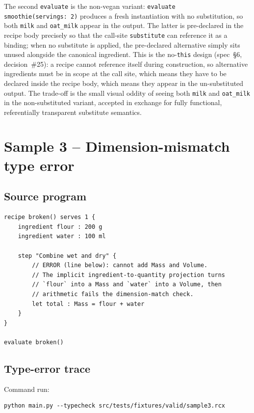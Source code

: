 \documentclass[11pt,a4paper]{article}
\begin{document}
The second \texttt{evaluate} is the non-vegan variant: \texttt{evaluate
smoothie(servings:~2)} produces a fresh instantiation with no
substitution, so both \texttt{milk} and \texttt{oat\_milk} appear in
the output. The latter is pre-declared in the recipe body precisely so
that the call-site \texttt{substitute} can reference it as a binding;
when no substitute is applied, the pre-declared alternative simply
sits unused alongside the canonical ingredient. This is the
no-\texttt{this} design (spec~\S6, decision~\#25): a recipe cannot
reference itself during construction, so alternative ingredients must
be in scope at the call site, which means they have to be declared
inside the recipe body, which means they appear in the un-substituted
output. The trade-off is the small visual oddity of seeing both
\texttt{milk} and \texttt{oat\_milk} in the non-substituted variant,
accepted in exchange for fully functional, referentially transparent
substitute semantics.


\section{Sample 3 -- Dimension-mismatch type error}

\subsection*{Source program}

\begin{lstlisting}
recipe broken() serves 1 {
    ingredient flour : 200 g
    ingredient water : 100 ml

    step "Combine wet and dry" {
        // ERROR (line below): cannot add Mass and Volume.
        // The implicit ingredient-to-quantity projection turns
        // `flour` into a Mass and `water` into a Volume, then
        // arithmetic fails the dimension-match check.
        let total : Mass = flour + water
    }
}

evaluate broken()
\end{lstlisting}

\subsection*{Type-error trace}

Command run:
\begin{lstlisting}[style=output]
python main.py --typecheck src/tests/fixtures/valid/sample3.rcx
\end{lstlisting}
\end{document}
